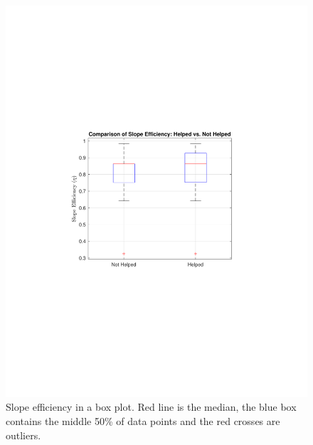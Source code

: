 \begin{minipage}[t]{0.5\textwidth} %
    \begin{figure}[H]
        \centering
        \includegraphics[width=\linewidth]{photos/SlopeEfficiency.pdf} %
        \caption{Slope efficiency in a box plot. Red line is the median, the blue box contains the middle 50\% of data points and the red crosses are outliers.}
        \label{result:fig:slope_efficiency}
    \end{figure}
\end{minipage}%
